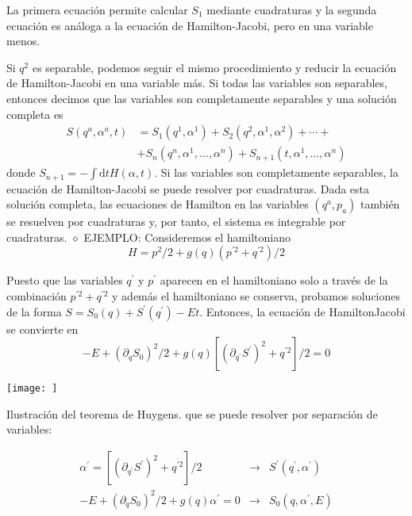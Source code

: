 La primera ecuación permite calcular $S_{1}$ mediante cuadraturas y la segunda ecuación es análoga a la ecuación de Hamilton-Jacobi, pero en una variable menos.

Si $q^{2}$ es separable, podemos seguir el mismo procedimiento y reducir la ecuación de Hamilton-Jacobi en una variable más. Si todas las variables son separables, entonces decimos que las variables son completamente separables y una solución completa es
$$
\begin{aligned}
S\left(q^{a}, \alpha^{a}, t\right) & =S_{1}\left(q^{1}, \alpha^{1}\right)+S_{2}\left(q^{2}, \alpha^{1}, \alpha^{2}\right)+\cdots+ \\
& +S_{n}\left(q^{n}, \alpha^{1}, \ldots, \alpha^{n}\right)+S_{n+1}\left(t, \alpha^{1}, \ldots, \alpha^{n}\right)
\end{aligned}
$$
donde $S_{n+1}=-\int \mathrm{d} t H(\alpha, t)$. Si las variables son completamente separables, la ecuación de Hamilton-Jacobi se puede resolver por cuadraturas. Dada esta solución completa, las ecuaciones de Hamilton en las variables $\left(q^{a}, p_{a}\right)$ también se resuelven por cuadraturas y, por tanto, el sistema es integrable por cuadraturas.
$\diamond$ EJEMPLO: Consideremos el hamiltoniano
$$
H=p^{2} / 2+g(q)\left(p^{\prime 2}+q^{\prime 2}\right) / 2
$$

Puesto que las variables $q^{\prime}$ y $p^{\prime}$ aparecen en el hamiltoniano solo a través de la combinación $p^{\prime 2}+q^{\prime 2}$ y además el hamiltoniano se conserva, probamos soluciones de la forma $S=S_{0}(q)+S^{\prime}\left(q^{\prime}\right)-E t$. Entonces, la ecuación de HamiltonJacobi se convierte en
$$
-E+\left(\partial_{q} S_{0}\right)^{2} / 2+g(q)\left[\left(\partial_{q^{\prime}} S^{\prime}\right)^{2}+q^{\prime 2}\right] / 2=0
$$

\begin{marginfigure}[]
  \texttt{[image: ]}
  \caption[]{Ilustración del teorema de Huygens.
  que se puede resolver por separación de variables:}
\end{marginfigure}


$$
\begin{array}{rll}
\alpha^{\prime}=\left[\left(\partial_{q^{\prime}} S^{\prime}\right)^{2}+q^{\prime 2}\right] / 2 & \rightarrow & S^{\prime}\left(q^{\prime}, \alpha^{\prime}\right) \\
-E+\left(\partial_{q} S_{0}\right)^{2} / 2+g(q) \alpha^{\prime}=0 & \rightarrow & S_{0}\left(q, \alpha^{\prime}, E\right)
\end{array}
$$
